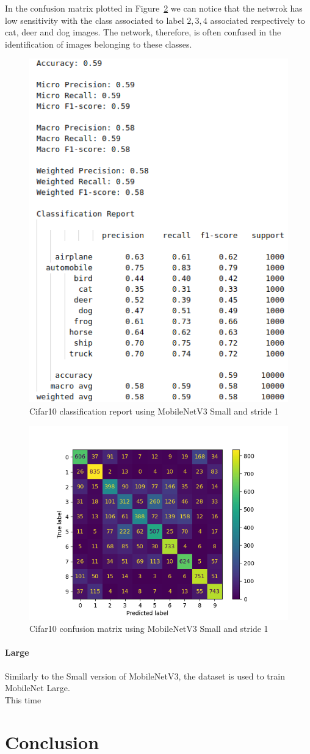 \documentclass[12pt, letterpaper, twoside]{article}
\begin{document}
In the confusion matrix plotted in Figure~\ref{fig:cifar10_small_stride1_cm} we can notice that the netwrok has low sensitivity with the class associated to label $2,3,4$ associated respectively to cat, deer and dog images. The network, therefore, is often confused in the identification of images belonging to these classes.

\begin{figure}[H]
	\centering
	\includegraphics[width=.5\textwidth]{report_cifar10_small_stride1.png}
	\caption{Cifar10 classification report using MobileNetV3 Small and stride 1}
	\label{fig:cifar10_small_stride1_report}
\end{figure}

\begin{figure}[H]
	\centering
	\includegraphics[width=.8\textwidth]{cm_cifar10_small_s1.png}
	\caption{Cifar10 confusion matrix using MobileNetV3 Small and stride 1}
	\label{fig:cifar10_small_stride1_cm}
\end{figure}

\paragraph{Large} 
Similarly to the Small version of MobileNetV3, the dataset is used to train MobileNet Large. \\
This time




\clearpage
\section{Conclusion}


\clearpage

\nocite{*}
\printbibliography[heading=bibintoc,title={References}]
\end{document}
